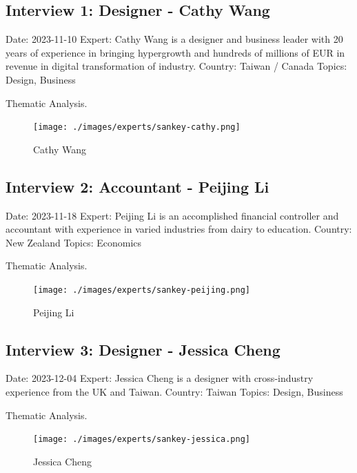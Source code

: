 \documentclass[
  letterpaper,
  DIV=11,
  numbers=noendperiod]{scrartcl}
\begin{document}
\subsection{Interview 1: Designer - Cathy
Wang}\label{interview-1-designer---cathy-wang}

Date: 2023-11-10 Expert: Cathy Wang is a designer and business leader
with 20 years of experience in bringing hypergrowth and hundreds of
millions of EUR in revenue in digital transformation of industry.
Country: Taiwan / Canada Topics: Design, Business

Thematic Analysis.

\begin{figure}[H]

{\centering \texttt{[image: ./images/experts/sankey-cathy.png]}

}

\caption{Cathy Wang}

\end{figure}%

\subsection{Interview 2: Accountant - Peijing
Li}\label{interview-2-accountant---peijing-li}

Date: 2023-11-18 Expert: Peijing Li is an accomplished financial
controller and accountant with experience in varied industries from
dairy to education. Country: New Zealand Topics: Economics

Thematic Analysis.

\begin{figure}[H]

{\centering \texttt{[image: ./images/experts/sankey-peijing.png]}

}

\caption{Peijing Li}

\end{figure}%

\subsection{Interview 3: Designer - Jessica
Cheng}\label{interview-3-designer---jessica-cheng}

Date: 2023-12-04 Expert: Jessica Cheng is a designer with cross-industry
experience from the UK and Taiwan. Country: Taiwan Topics: Design,
Business

Thematic Analysis.

\begin{figure}[H]

{\centering \texttt{[image: ./images/experts/sankey-jessica.png]}

}

\caption{Jessica Cheng}

\end{figure}%
\end{document}
